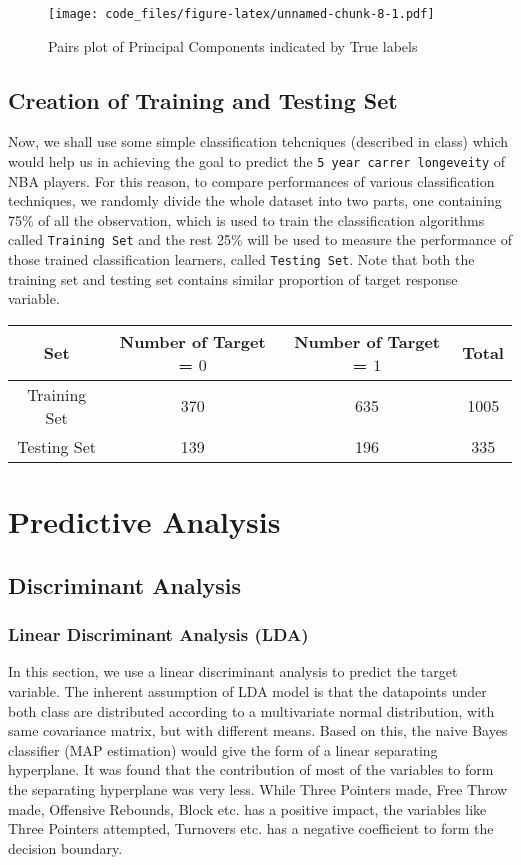 \documentclass[10pt]{article}
\begin{document}
\begin{figure}[H]
	\texttt{[image: code\_files/figure-latex/unnamed-chunk-8-1.pdf]}
	\caption{Pairs plot of Principal Components indicated by True labels}
	\label{fig:pairsplot}
\end{figure}


\subsection{Creation of Training and Testing Set}

Now, we shall use some simple classification tehcniques (described in class) which would help us in achieving the goal to predict the \texttt{5\ year\ carrer\ longeveity} of NBA players. For this reason, to compare performances of various classification techniques, we randomly divide the whole dataset into two parts, one containing 75\% of all the observation, which is used to train the classification algorithms called \texttt{Training\ Set} and the rest 25\% will be used to measure the performance of those trained classification learners, called \texttt{Testing\ Set}. Note that both the training set and testing set contains similar proportion of target response variable.

\begin{center}
	\begin{tabular}{|c|c|c|c|}
		\hline 
		Set & Number of Target = $0$ & Number of Target = $1$ & Total\\
		\hline 
		Training Set & 370 & 635 & 1005\\
		Testing Set & 139 & 196 & 335\\
		\hline 
	\end{tabular}
\end{center}

\section{Predictive Analysis}
\subsection{Discriminant Analysis}
\subsubsection{Linear Discriminant Analysis (LDA)}

In this section, we use a linear discriminant analysis to predict the target variable. The inherent assumption of LDA model is that the datapoints under both class are distributed according to a multivariate normal distribution, with same covariance matrix, but with different means. Based on this, the naive Bayes classifier (MAP estimation) would give the form of a linear separating hyperplane. It was found that the contribution of most of the variables to form the separating hyperplane was very less. While Three Pointers made, Free Throw made, Offensive Rebounds, Block etc. has a positive impact, the variables like Three Pointers attempted, Turnovers etc. has a negative coefficient to form the decision boundary. 
\end{document}
